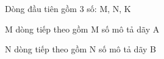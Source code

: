 Dòng đầu tiên gồm 3 số: M, N, K  

   M dòng tiếp theo gồm M số mô tả dãy A  

   N dòng tiếp theo gồm N số mô tả dãy B